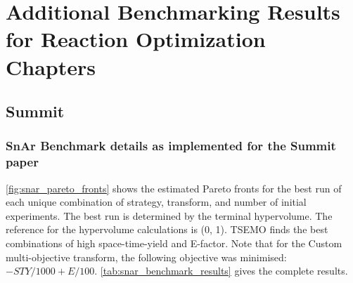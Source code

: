 \chapter{Additional Benchmarking Results for Reaction Optimization Chapters}\label{ch:benchmarking_appendix}
\section{Summit}
\subsection{SnAr Benchmark details as implemented for the Summit paper}

\ref{fig:snar_pareto_fronts} shows the estimated Pareto fronts for the best run of each unique combination of strategy, transform, and number of initial experiments. The best run is determined by the terminal hypervolume.  The reference for the hypervolume calculations is (0, 1). TSEMO finds the best combinations of high space-time-yield and E-factor. Note that for the Custom multi-objective transform, the following objective was minimised: $-STY/1000+E/100$. \ref{tab:snar_benchmark_results} gives the complete results.

